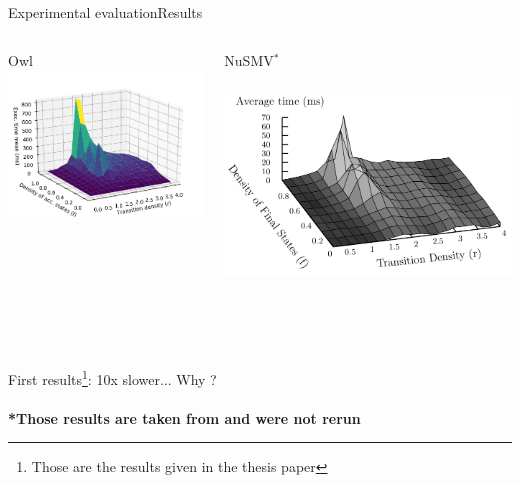 \documentclass[10pt]{beamer}
\begin{document}
\begin{frame}{Experimental evaluation}{Results}
  \begin{columns}[T]
   \begin{column}{.5\textwidth}
       \begin{block}{Owl}
       \includegraphics[scale=0.4]{img/defense/this-average-antichain}
       \end{block}
     \end{column}
     \begin{column}{.5\textwidth}
         \begin{block}{NuSMV$^*$}
           \\~\\
            \includegraphics[scale=0.2]{img/defense/original-average-antichain}
         \end{block}
     \end{column}
 \end{columns}
 \\~\\~\\

First results\footnote{Those are the results given in the thesis paper}: 10x slower... Why ? \\~\\
\footnotesize \textbf{*Those results are taken from \cite{antichain-universality} and were not rerun}

\end{frame}
\end{document}
